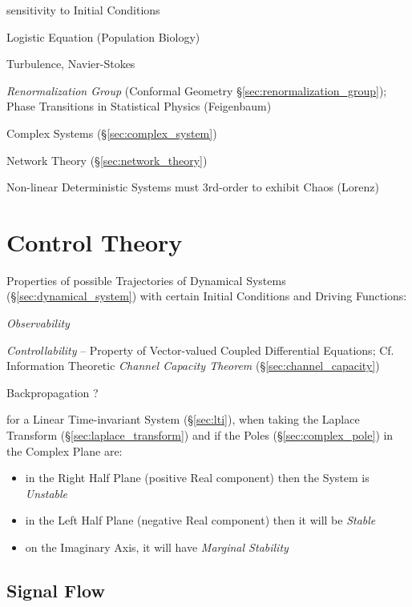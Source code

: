 sensitivity to Initial Conditions

Logistic Equation (Population Biology)

Turbulence, Navier-Stokes

\emph{Renormalization Group} (Conformal Geometry
\S\ref{sec:renormalization_group}); Phase Transitions in Statistical Physics
(Feigenbaum)

Complex Systems (\S\ref{sec:complex_system})

Network Theory (\S\ref{sec:network_theory})

Non-linear Deterministic Systems must 3rd-order to exhibit Chaos (Lorenz)



\section{Control Theory}\label{sec:control_theory}

Properties of possible Trajectories of Dynamical Systems
(\S\ref{sec:dynamical_system}) with certain Initial Conditions and
Driving Functions:

\emph{Observability}

\emph{Controllability} -- Property of Vector-valued Coupled
Differential Equations; \fist Cf. Information Theoretic \emph{Channel
  Capacity Theorem} (\S\ref{sec:channel_capacity})

Backpropagation ?


for a Linear Time-invariant System (\S\ref{sec:lti}), when taking the Laplace
Transform (\S\ref{sec:laplace_transform}) and if the Poles
(\S\ref{sec:complex_pole}) in the Complex Plane are:
\begin{itemize}
  \item in the Right Half Plane (positive Real component) then the System is
    \emph{Unstable}
  \item in the Left Half Plane (negative Real component) then it will be
    \emph{Stable}
  \item on the Imaginary Axis, it will have \emph{Marginal Stability}
\end{itemize}



\subsection{Signal Flow}\label{sec:signal_flow}


